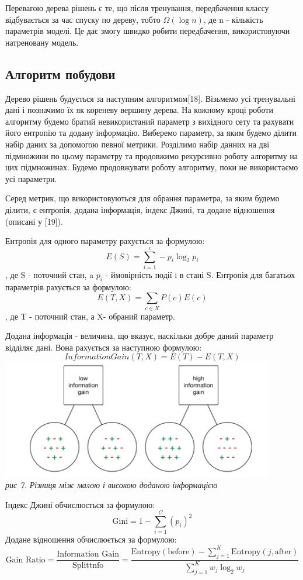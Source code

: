 Перевагою дерева рішень є те, що після тренування, передбачення классу відбувається за час спуску по дереву, тобто 
$\Omega(\log n)$, де n - кількість параметрів моделі. Це дає змогу швидко робити передбачення, використовуючи натреновану модель.
\subsection{Алгоритм побудови}
Дерево рішень будується за наступним алгоритмом[18]. Візьмемо усі тренувальні дані і позначимо їх як кореневу вершину дерева. На кожному кроці роботи алгоритму будемо братий невикористаний параметр з вихідного сету та рахувати його ентропію та додану інформацію. Виберемо параметр, за яким будемо ділити набір даних за допомогою певної метрики. Розділимо набір данних на дві підмножини по цьому параметру та продовжимо рекурсивно роботу алгоритму на цих підмножинах. Будемо продовжувати роботу алгоритму, поки не використаємо усі параметри.

Серед метрик, що використовуються для обрання параметра, за яким будемо ділити, є ентропія, додана інформація, індекс Джині, та додане відношення (описані у [19]).

Ентропія для одного параметру рахується за формулою:
$$
E(S)=\sum_{i=1}^{c}-p_{i} \log _{2} p_{i}
$$, де  S  - поточний стан, a $p_i$ - ймовірність події  i в стані S.
Ентропія для багатьох параметрів рахується за формулою: $$
E(T, X)=\sum_{c \in X} P(c) E(c)
$$, де T - поточний стан, а X- обраний параметр.

Додана інформація - величина, що вказує, наскільки добре даний параметр відділяє дані. 
Вона рахується за наступною формулою: 
$$Information Gain(T,X) = E(T) - E(T, X)$$
\includegraphics[width=450]{Dissertation/ig.png}\\
\textit{рис 7. Різниця між малою і високою доданою інформацією}

Індекс Джині обчислюється за формулою:
$$
\text {Gini}=1-\sum_{i=1}^{C}\left(p_{i}\right)^{2}
$$
Додане відношення обчислюється за формулою: 
$$
\text {Gain Ratio}=\frac{\text {Information Gain}}{\text {Splittnfo}}=\frac{\text {Entropy}(\text {before})-\sum_{j=1}^{K} \text {Entropy}(j, \text {after})}{\sum_{j=1}^{K} w_{j} \log _{2} w_{j}}
$$




